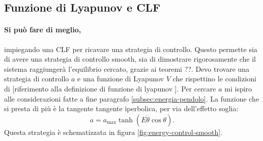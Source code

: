 \subsection{Funzione di Lyapunov e CLF}
\paragraph{Si può fare di meglio,} impiegando una CLF per ricavare una strategia di controllo. Questo permette sia di avere una strategia di controllo smooth, sia di dimostrare rigorosamente che il sistema raggiungerà l'equilibrio cercato, grazie ai teoremi ??.
Devo trovare una strategia di controllo $a$ e una funzione di Lyapunov $V$ che rispettino le condizioni di [riferimento alla definizione di funzione di lyapunov ].
Per cercare $a$ mi ispiro alle considerazioni fatte a fine paragrafo \ref{subsec:energia-pendolo}. La funzione che si presta di più è la tangente tangente iperbolica, per via dell'effetto soglia:
\begin{equation}
    a = a_{\max} \tanh(E \dot \theta \cos \theta).
    \label{eq:control-strategy-test}
\end{equation}
Questa strategia è schematizzata in figura \ref{fig:energy-control-smooth}.
